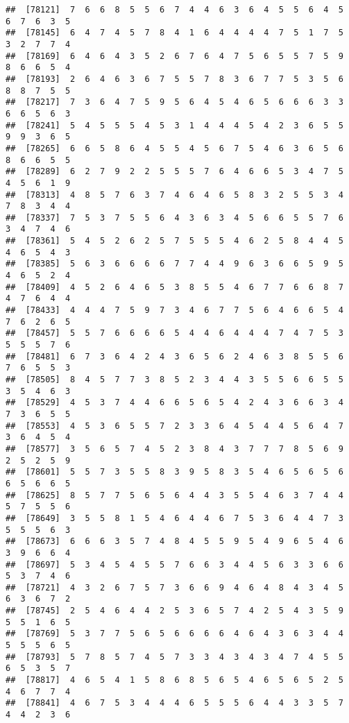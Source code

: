 \documentclass[
]{book}
\begin{document}
\begin{verbatim}
##  [78121]  7  6  6  8  5  5  6  7  4  4  6  3  6  4  5  5  6  4  5  6  7  6  3  5
##  [78145]  6  4  7  4  5  7  8  4  1  6  4  4  4  4  7  5  1  7  5  3  2  7  7  4
##  [78169]  6  4  6  4  3  5  2  6  7  6  4  7  5  6  5  5  7  5  9  8  6  6  5  4
##  [78193]  2  6  4  6  3  6  7  5  5  7  8  3  6  7  7  5  3  5  6  8  8  7  5  5
##  [78217]  7  3  6  4  7  5  9  5  6  4  5  4  6  5  6  6  6  3  3  6  6  5  6  3
##  [78241]  5  4  5  5  5  4  5  3  1  4  4  4  5  4  2  3  6  5  5  9  9  3  6  5
##  [78265]  6  6  5  8  6  4  5  5  4  5  6  7  5  4  6  3  6  5  6  8  6  6  5  5
##  [78289]  6  2  7  9  2  2  5  5  5  7  6  4  6  6  5  3  4  7  5  4  5  6  1  9
##  [78313]  4  8  5  7  6  3  7  4  6  4  6  5  8  3  2  5  5  3  4  7  8  3  4  4
##  [78337]  7  5  3  7  5  5  6  4  3  6  3  4  5  6  6  5  5  7  6  3  4  7  4  6
##  [78361]  5  4  5  2  6  2  5  7  5  5  5  4  6  2  5  8  4  4  5  4  6  5  4  3
##  [78385]  5  6  3  6  6  6  6  7  7  4  4  9  6  3  6  6  5  9  5  4  6  5  2  4
##  [78409]  4  5  2  6  4  6  5  3  8  5  5  4  6  7  7  6  6  8  7  4  7  6  4  4
##  [78433]  4  4  4  7  5  9  7  3  4  6  7  7  5  6  4  6  6  5  4  7  6  2  6  5
##  [78457]  5  5  7  6  6  6  6  5  4  4  6  4  4  4  7  4  7  5  3  5  5  5  7  6
##  [78481]  6  7  3  6  4  2  4  3  6  5  6  2  4  6  3  8  5  5  6  7  6  5  5  3
##  [78505]  8  4  5  7  7  3  8  5  2  3  4  4  3  5  5  6  6  5  5  3  5  4  6  3
##  [78529]  4  5  3  7  4  4  6  6  5  6  5  4  2  4  3  6  6  3  4  7  3  6  5  5
##  [78553]  4  5  3  6  5  5  7  2  3  3  6  4  5  4  4  5  6  4  7  3  6  4  5  4
##  [78577]  3  5  6  5  7  4  5  2  3  8  4  3  7  7  7  8  5  6  9  2  5  2  5  9
##  [78601]  5  5  7  3  5  5  8  3  9  5  8  3  5  4  6  5  6  5  6  6  5  6  6  5
##  [78625]  8  5  7  7  5  6  5  6  4  4  3  5  5  4  6  3  7  4  4  5  7  5  5  6
##  [78649]  3  5  5  8  1  5  4  6  4  4  6  7  5  3  6  4  4  7  3  5  5  5  6  3
##  [78673]  6  6  6  3  5  7  4  8  4  5  5  9  5  4  9  6  5  4  6  3  9  6  6  4
##  [78697]  5  3  4  5  4  5  5  7  6  6  3  4  4  5  6  3  3  6  6  5  3  7  4  6
##  [78721]  4  3  2  6  7  5  7  3  6  6  9  4  6  4  8  4  3  4  5  6  3  6  7  2
##  [78745]  2  5  4  6  4  4  2  5  3  6  5  7  4  2  5  4  3  5  9  5  5  1  6  5
##  [78769]  5  3  7  7  5  6  5  6  6  6  6  4  6  4  3  6  3  4  4  5  5  5  6  5
##  [78793]  5  7  8  5  7  4  5  7  3  3  4  3  4  3  4  7  4  5  5  6  5  3  5  7
##  [78817]  4  6  5  4  1  5  8  6  8  5  6  5  4  6  5  6  5  2  5  4  6  7  7  4
##  [78841]  4  6  7  5  3  4  4  4  6  5  5  5  6  4  4  3  3  5  7  4  4  2  3  6

\end{verbatim}
\end{document}
